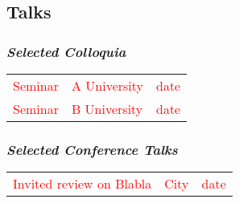 \begin{itemize}[topsep=0pt,itemsep=0.62ex,partopsep=0ex,parsep=0.5ex]

\end{itemize}

\subsection*{Talks}
\subsubsection*{\textit{Selected Colloquia}}
\vspace{-0.5cm}
\begin{longtable}{p{7.5cm}p{6cm}l}
\textcolor{red}{Seminar}		& \textcolor{red}{A University}				& \textcolor{red}{date} \\
\textcolor{red}{Seminar}		& \textcolor{red}{B University}				& \textcolor{red}{date} \\
\end{longtable}

\subsubsection*{\textit{Selected Conference Talks}}
\vspace{-0.5cm}
\begin{longtable}{p{7.5cm}p{6cm}l}
\textcolor{red}{Invited review on Blabla}		& \textcolor{red}{City}				& \textcolor{red}{date}\\
\end{longtable}


